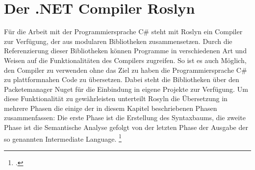 \section{Der .NET Compiler Roslyn}
Für die Arbeit mit der Programmiersprache C\# steht mit Roslyn ein Compiler zur Verfügung, der aus modularen Bibliotheken zusammensetzen. Durch die Referenzierung dieser Bibliotheken können Programme in verschiedenen Art und Weisen auf die Funktionalitäten des Compilers zugreifen.  So ist es auch Möglich, den Compiler zu verwenden ohne das Ziel zu haben die Programmiersprache C\# zu plattformnahen Code zu übersetzen.  Dabei steht die Bibliotheken über den Packetemanager Nuget für die Einbindung in eigene Projekte zur Verfügung.  Um diese Funktionalität zu gewährleisten unterteilt Rosyln die Übersetzung in mehrere Phasen die einige der in diesem Kapitel beschriebenen Phasen zusammenfassen: Die erste Phase ist die Erstellung des Syntaxbaums, die zweite Phase ist die Semantische Analyse gefolgt von der letzten Phase der Ausgabe der so genannten Intermediate Language. \footcite[Vgl.][S. 1017]{Albahari2020}



